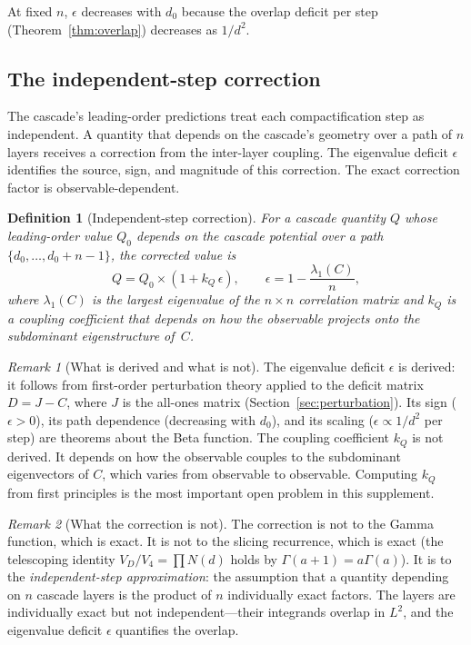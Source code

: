 \documentclass[12pt,a4paper]{article}
\newtheorem{definition}[theorem]{Definition}
\theoremstyle{remark}
\newtheorem*{remark}{Remark}
\begin{document}
\noindent At fixed $n$, $\epsilon$ decreases with $d_0$ because the overlap deficit per step (Theorem~\ref{thm:overlap}) decreases as $1/d^2$.

\subsection{The independent-step correction}

The cascade's leading-order predictions treat each compactification step as independent. A quantity that depends on the cascade's geometry over a path of $n$ layers receives a correction from the inter-layer coupling. The eigenvalue deficit $\epsilon$ identifies the source, sign, and magnitude of this correction. The exact correction factor is observable-dependent.

\begin{definition}[Independent-step correction]
For a cascade quantity $Q$ whose leading-order value $Q_0$ depends on the cascade potential over a path $\{d_0, \ldots, d_0 + n - 1\}$, the corrected value is
\begin{equation}\label{eq:correction}
Q = Q_0 \times \left(1 + k_Q\, \epsilon\right), \qquad \epsilon = 1 - \frac{\lambda_1(C)}{n},
\end{equation}
where $\lambda_1(C)$ is the largest eigenvalue of the $n \times n$ correlation matrix and $k_Q$ is a coupling coefficient that depends on how the observable projects onto the subdominant eigenstructure of~$C$.
\end{definition}

\begin{remark}[What is derived and what is not]
The eigenvalue deficit $\epsilon$ is derived: it follows from first-order perturbation theory applied to the deficit matrix $D = J - C$, where $J$ is the all-ones matrix (Section~\ref{sec:perturbation}). Its sign ($\epsilon > 0$), its path dependence (decreasing with $d_0$), and its scaling ($\epsilon \propto 1/d^2$ per step) are theorems about the Beta function. The coupling coefficient $k_Q$ is not derived. It depends on how the observable couples to the subdominant eigenvectors of $C$, which varies from observable to observable. Computing $k_Q$ from first principles is the most important open problem in this supplement.
\end{remark}

\begin{remark}[What the correction is not]
The correction is not to the Gamma function, which is exact. It is not to the slicing recurrence, which is exact (the telescoping identity $V_D/V_4 = \prod N(d)$ holds by $\Gamma(a+1) = a\Gamma(a)$). It is to the \emph{independent-step approximation}: the assumption that a quantity depending on $n$ cascade layers is the product of $n$ individually exact factors. The layers are individually exact but not independent---their integrands overlap in $L^2$, and the eigenvalue deficit $\epsilon$ quantifies the overlap.
\end{remark}
\end{document}
